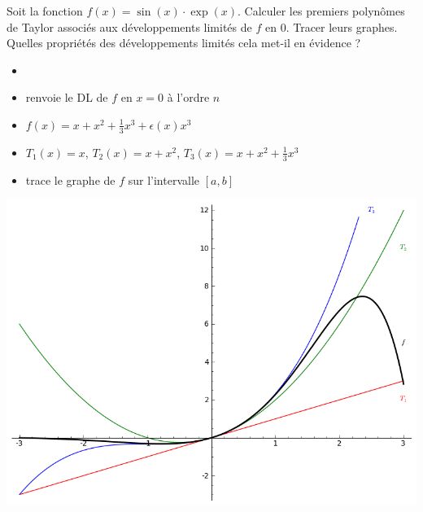 \begin{frame}[fragile]
\begin{tp}
Soit la fonction $f(x)= \sin(x) \cdot \exp(x)$.
Calculer les premiers polynômes de Taylor associés aux développements limités de $f$ en $0$. 
Tracer leurs graphes. Quelles propriétés des développements limités cela met-il en évidence ?
\end{tp}

\pause

\begin{itemize}
  \item {}
  \pause
  \item {} renvoie le DL de
  $f$ en $x=0$ à l'ordre $n$
  \pause
  \item $f(x) = x + x^2 + \frac13 x^3+ \epsilon(x) x^3$
  \pause
  \item $T_1(x) = x$,  $T_2(x)=x+x^2$, $T_3(x) =  x + x^2 + \frac13 x^3$
  
\pause

  \item {} trace le graphe de $f$ sur l'intervalle $[a,b]$
\end{itemize}

\end{frame}


\begin{frame}
\begin{center}
\includegraphics[scale=0.5]{figures/formel-taylor}
\end{center}

\end{frame}


